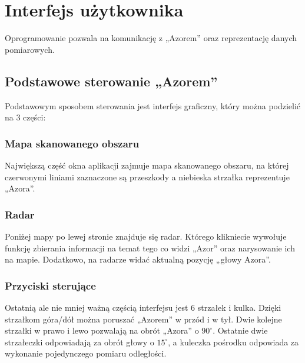 \section{Interfejs użytkownika}
    \tab Oprogramowanie pozwala na komunikację z „Azorem” oraz reprezentację danych pomiarowych.

    

    \subsection{Podstawowe sterowanie „Azorem”}
        \tab Podstawowym sposobem sterowania jest interfejs graficzny, który można podzielić na 3 części:

        \subsubsection{Mapa skanowanego obszaru}        
            \tab Największą część okna aplikacji zajmuje mapa skanowanego obszaru, 
            na której czerwonymi liniami zaznaczone są przeszkody a niebieska strzałka reprezentuje „Azora”.

        \subsubsection{Radar}
            \tab Poniżej mapy po lewej stronie znajduje się radar. 
            Którego klikniecie wywołuje funkcję zbierania informacji na temat tego co widzi „Azor” oraz narysowanie ich na mapie. 
            Dodatkowo, na radarze widać aktualną pozycję „głowy Azora”.
        
        \subsubsection{Przyciski sterujące}
            \tab Ostatnią ale nie mniej ważną częścią interfejsu jest 6 strzałek i kulka. 
            Dzięki strzałkom góra/dół można poruszać „Azorem” w przód i w tył.
            Dwie kolejne strzałki w prawo i lewo pozwalają na obrót „Azora” o $90^\circ$.
            Ostatnie dwie strzałeczki odpowiadają za obrót głowy o $15^\circ$, a kuleczka pośrodku odpowiada za wykonanie pojedynczego pomiaru odległości.

